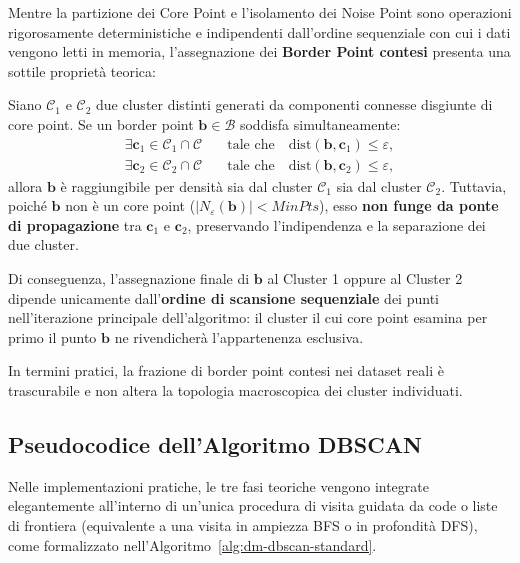 Mentre la partizione dei Core Point e l'isolamento dei Noise Point sono operazioni rigorosamente deterministiche e indipendenti dall'ordine sequenziale con cui i dati vengono letti in memoria, l'assegnazione dei \textbf{Border Point contesi} presenta una sottile proprietà teorica:

\begin{property}
Siano $\mathcal{C}_1$ e $\mathcal{C}_2$ due cluster distinti generati da componenti connesse disgiunte di core point. Se un border point $\mathbf{b} \in \mathcal{B}$ soddisfa simultaneamente:
\begin{equation}
\begin{aligned}
    \exists \mathbf{c}_1 \in \mathcal{C}_1 \cap \mathcal{C} \quad &\text{tale che} \quad \mathrm{dist}(\mathbf{b}, \mathbf{c}_1) \le \varepsilon, \\
    \exists \mathbf{c}_2 \in \mathcal{C}_2 \cap \mathcal{C} \quad &\text{tale che} \quad \mathrm{dist}(\mathbf{b}, \mathbf{c}_2) \le \varepsilon,
\end{aligned}
\end{equation}
allora $\mathbf{b}$ è raggiungibile per densità sia dal cluster $\mathcal{C}_1$ sia dal cluster $\mathcal{C}_2$.
Tuttavia, poiché $\mathbf{b}$ non è un core point ($|N_\varepsilon(\mathbf{b})| < MinPts$), esso \textbf{non funge da ponte di propagazione} tra $\mathbf{c}_1$ e $\mathbf{c}_2$, preservando l'indipendenza e la separazione dei due cluster.

Di conseguenza, l'assegnazione finale di $\mathbf{b}$ al Cluster 1 oppure al Cluster 2 dipende unicamente dall'\textbf{ordine di scansione sequenziale} dei punti nell'iterazione principale dell'algoritmo: il cluster il cui core point esamina per primo il punto $\mathbf{b}$ ne rivendicherà l'appartenenza esclusiva.
\end{property}

In termini pratici, la frazione di border point contesi nei dataset reali è trascurabile e non altera la topologia macroscopica dei cluster individuati.

\subsection{Pseudocodice dell'Algoritmo DBSCAN}

Nelle implementazioni pratiche, le tre fasi teoriche vengono integrate elegantemente all'interno di un'unica procedura di visita guidata da code o liste di frontiera (equivalente a una visita in ampiezza BFS o in profondità DFS), come formalizzato nell'Algoritmo~\ref{alg:dm-dbscan-standard}.

